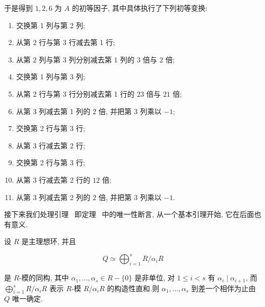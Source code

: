 于是得到 $1, 2, 6$ 为 $A$ 的初等因子, 其中具体执行了下列初等变换:
\begin{enumerate}
\item 交换第 1 列与第 2 列;
\item 从第 2 行与第 3 行减去第 1 行;
\item 从第 2 列与第 3 列分别减去第 1 列的 $3$ 倍与 $2$ 倍;
\item 交换第 1 列与第 3 列;
\item 从第 2 行与第 3 行分别减去第 1 行的 $23$ 倍与 $21$ 倍;
\item 从第 3 列减去第 1 列的 $2$ 倍, 并把第 3 列乘以 $-1$;
\item 交换第 2 行与第 3 行;
\item 从第 3 行减去第 2 行;
\item 交换第 2 行与第 3 行;
\item 从第 3 行减去第 2 行的 $12$ 倍;
\item 从第 3 列减去第 2 列的 $2$ 倍, 并把第 3 列乘以 $-1$.
\end{enumerate}

接下来我们处理引理~ 即定理~ 中的唯一性断言, 从一个基本引理开始, 它在后面也有意义.

\begin{lemma}\label{lem:6.3.6}
设 $R$ 是主理想环, 并且

\[
Q \simeq \bigoplus_{i = 1}^{s} R/\alpha_i R\]

是 $R$-模的同构, 其中 $\alpha_1, \ldots, \alpha_s \in R - \{0\}$ 是非单位, 对 $1 \leq i < s$ 有 $\alpha_i \mid \alpha_{i + 1}$, 而 $\bigoplus_{i = 1}^{s} R/\alpha_i R$ 表示 $R$-模 $R/\alpha_i R$ 的构造性直和.则 $\alpha_1, \ldots, \alpha_s$ 到差一个相伴为止由 $Q$ 唯一确定.
\end{lemma}

